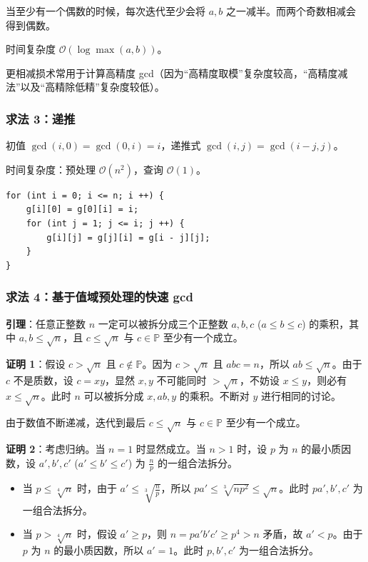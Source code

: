 当至少有一个偶数的时候，每次迭代至少会将 $a, b$ 之一减半。而两个奇数相减会得到偶数。

时间复杂度 $\mathcal{O}(\log \max(a, b))$。

更相减损术常用于计算高精度 gcd（因为“高精度取模”复杂度较高，“高精度减法”以及“高精除低精”复杂度较低）。


\subsubsection{求法 3：递推}

初值 $\gcd(i, 0) = \gcd(0, i) = i$，递推式 $\gcd(i, j) = \gcd(i - j, j)$。

时间复杂度：预处理 $\mathcal{O}(n^2)$，查询 $\mathcal{O}(1)$。

\begin{verbatim}
for (int i = 0; i <= n; i ++) {
    g[i][0] = g[0][i] = i;
    for (int j = 1; j <= i; j ++) {
        g[i][j] = g[j][i] = g[i - j][j];
    }
}
\end{verbatim}

\subsubsection{求法 4：基于值域预处理的快速 gcd}

\textbf{引理}：任意正整数 $n$ 一定可以被拆分成三个正整数 $a, b, c$ ($a \leq b \leq c$) 的乘积，其中 $a, b\leq \sqrt{n}$，且 $c \leq \sqrt{n}$ 与 $c \in \mathbb{P}$ 至少有一个成立。

\textbf{证明 1}：假设 $c > \sqrt{n}$ 且 $c \notin \mathbb{P}$。因为 $c > \sqrt{n}$ 且 $abc = n$，所以 $ab \leq \sqrt{n}$。由于 $c$ 不是质数，设 $c = xy$，显然 $x, y$ 不可能同时 $>\sqrt{n}$，不妨设 $x \leq y$，则必有 $x \leq \sqrt{n}$。此时 $n$ 可以被拆分成 $x, ab, y$ 的乘积。不断对 $y$ 进行相同的讨论。

由于数值不断递减，迭代到最后 $c \leq \sqrt{n}$ 与 $c \in \mathbb{P}$ 至少有一个成立。

\textbf{证明 2}：考虑归纳。当 $n = 1$ 时显然成立。当 $n > 1$ 时，设 $p$ 为 $n$ 的最小质因数，设 $a', b', c'$ ($a' \leq b' \leq c'$) 为 $\frac{n}{p}$ 的一组合法拆分。

\begin{itemize}
    \item 当 $p \leq \sqrt[4]{n}$ 时，由于 $a' \leq \sqrt[3]{\frac{n}{p}}$，所以 $pa' \leq \sqrt[3]{np^2} \leq \sqrt{n}$。此时 $pa', b', c'$ 为一组合法拆分。
    \item 当 $p > \sqrt[4]{n}$ 时，假设 $a' \geq p$，则 $n = pa'b'c' \geq p^4 > n$ 矛盾，故 $a' < p$。由于 $p$ 为 $n$ 的最小质因数，所以 $a' = 1$。此时 $p, b', c'$ 为一组合法拆分。
\end{itemize}

